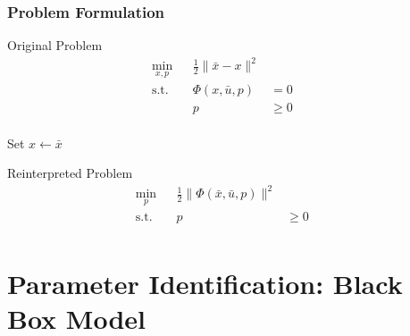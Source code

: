 \documentclass[table]{beamer}
\begin{document}
\begin{frame}
    \frametitle{Problem Formulation}

    Original Problem
    \begin{align*}
        \min_{x,p} & & \frac{1}{2} \| \bar{x} - x \|^2 & & \\
        \operatorname{s.t.} & & \Phi(x,\bar{u},p) & = 0 & & \\
                            & & p & \geq 0 & & \\
    \end{align*}

    Set $x \leftarrow \bar{x}$

    Reinterpreted Problem
    \begin{align*}
        \min_{p}  & & \frac{1}{2} \| \Phi(\bar{x},\bar{u},p) \|^2 & & \\
        \operatorname{s.t.} & & p & \geq 0 & & \\
    \end{align*}
\end{frame}

\section{Parameter Identification: Black Box Model}
\end{document}
